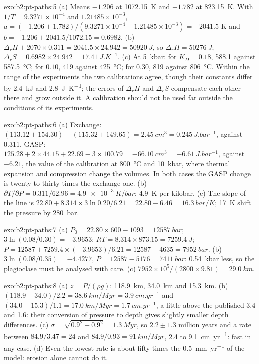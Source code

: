 \begin{solution}{exo:b2:pt-paths:5}
(a) Means $-1.206$ at \qty{1072.15}{K} and $-1.782$ at \qty{823.15}{K}. With $1/T =
9.3271\times10^{-4}$ and $1.21485\times10^{-3}$, $a = (-1.206 + 1.782)/(9.3271\times10^{-4}
- 1.21485\times10^{-3}) = -2041.5$ K and $b = -1.206 + 2041.5/1072.15 = 0.6982$.
(b) $\Delta_r H + 2070\times0.311 = 2041.5\times24.942 = \qty{50920}{J}$, so $\Delta_r H =
\qty{50276}{J}$; $\Delta_r S = 0.6982\times24.942 = \qty{17.41}{J.K^{-1}}$. (c) At
\qty{5}{kbar}: for $K_D = 0.18$, 588.1 against \qty{587.5}{\celsius}; for $0.10$, 419
against \qty{425}{\celsius}; for $0.30$, 819 against \qty{806}{\celsius}. Within the range
of the experiments the two calibrations agree, though their constants differ by
\qty{2.4}{kJ} and \qty{2.8}{J.K^{-1}}; the errors of $\Delta_r H$ and $\Delta_r S$
compensate each other there and grow outside it. A calibration should not be used far
outside the conditions of its experiments.
\end{solution}

\begin{solution}{exo:b2:pt-paths:6}
(a) Exchange: $(113.12 + 154.30) - (115.32 + 149.65) = \qty{+2.45}{cm^3} =
\qty{0.245}{J.bar^{-1}}$, against 0.311. GASP: $125.28 + 2\times44.15 + 22.69 -
3\times100.79 = \qty{-66.10}{cm^3} = \qty{-6.61}{J.bar^{-1}}$, against $-6.21$, the value
of the calibration at \qty{800}{\celsius} and \qty{10}{kbar}, where thermal expansion and
compression change the volumes. In both cases the GASP change is twenty to thirty times
the exchange one. (b) $\partial T/\partial P = 0.311/62.96 = \qty{4.9e-3}{K/bar}$:
\qty{4.9}{K} per kilobar. (c) The slope of the line is $22.80 + 8.314\times3\ln 0.20/6.21
= 22.80 - 6.46 = \qty{16.3}{bar/K}$; \qty{17}{K} shift the pressure by
\qty{280}{bar}.
\end{solution}

\begin{solution}{exo:b2:pt-paths:7}
(a) $P_0 = 22.80\times600 - 1093 = \qty{12587}{bar}$; $3\ln(0.08/0.30) = -3.9653$; $RT =
8.314\times873.15 = \qty{7259.4}{J}$; $P = 12587 + 7259.4\times(-3.9653)/6.21 = 12587 -
4635 = \qty{7952}{bar}$. (b) $3\ln(0.08/0.35) = -4.4277$, $P = 12587 - 5176 =
\qty{7411}{bar}$: \qty{0.54}{kbar} less, so the plagioclase must be analysed with care.
(c) $7952\times10^5/(2800\times9.81) = \qty{29.0}{km}$.
\end{solution}

\begin{solution}{exo:b2:pt-paths:8}
(a) $z = P/(\bar\rho g)$: \qty{118.9}{km}, \qty{34.0}{km} and \qty{15.3}{km}.
(b) $(118.9 - 34.0)/2.2 = \qty{38.6}{km/Myr} = \qty{3.9}{cm.yr^{-1}}$ and $(34.0 -
15.3)/1.1 = \qty{17.0}{km/Myr} = \qty{1.7}{cm.yr^{-1}}$, a little above the published
3.4 and 1.6: their conversion of pressure to depth gives slightly smaller depth
differences. (c) $\sigma = \sqrt{0.9^2 + 0.9^2} = \qty{1.3}{Myr}$, so $2.2 \pm 1.3$
million years and a rate between $84.9/3.47 = 24$ and $84.9/0.93 = \qty{91}{km/Myr}$,
2.4 to \qty{9.1}{cm.yr^{-1}}: fast in any case. (d) Even the lowest rate is about fifty times
the \qty{0.5}{mm.yr^{-1}} of the model: erosion alone cannot do it.
\end{solution}

